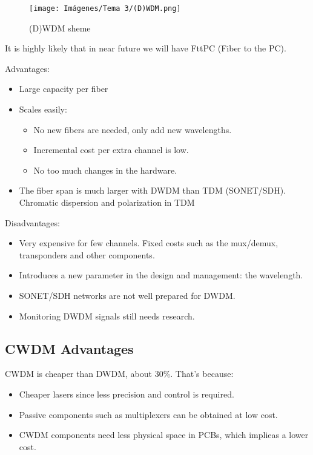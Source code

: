 \documentclass[
	12pt,
	twoside
]{book}
\begin{document}
\begin{figure}[H]
	\centering
	\texttt{[image: Imágenes/Tema 3/(D)WDM.png]}
	\caption{
		\label{fig:unit3_DWDM}
		(D)WDM sheme
	}
\end{figure}

It is highly likely that in near future we will have FttPC (Fiber to the PC).

Advantages:

\begin{itemize}
	\item Large capacity per fiber
	\item {
		Scales easily:
		\begin{itemize}
			\item No new fibers are needed, only add new wavelengths.
			\item Incremental cost per extra channel is low.
			\item No too much changes in the hardware.
		\end{itemize}
	}
	\item The fiber span is much larger with DWDM than TDM (SONET/SDH). Chromatic dispersion and polarization in TDM
\end{itemize}

Disadvantages:

\begin{itemize}
	\item Very expensive for few channels. Fixed costs such as the mux/demux, transponders and other components.
	\item Introduces a new parameter in the design and management: the wavelength.
	\item SONET/SDH networks are not well prepared for DWDM.
	\item Monitoring DWDM signals still needs research.
\end{itemize}

\subsection{CWDM Advantages}

CWDM is cheaper than DWDM, about 30\%. That’s because:

\begin{itemize}
	\item Cheaper lasers since less precision and control is required.
	\item Passive components such as multiplexers can be obtained at low cost.
	\item CWDM components need less physical space in PCBs, which implieas a lower cost.
\end{itemize}
\end{document}
